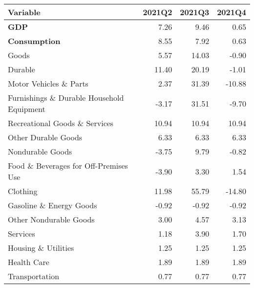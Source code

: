 \documentclass[11pt, letterpaper]{article}\usepackage[]{graphicx}\usepackage[]{color}
\begin{document}
\begin{table}[H]
\centering
\begingroup\fontsize{10pt}{12pt}\selectfont
\begin{tabular}{lrrr}
  \hline
Variable & 2021Q2 & 2021Q3 & 2021Q4 \\ 
  \hline
\hspace{0mm} \textbf{GDP} & 7.26 & 9.46 & 0.65 \\ 
  \hspace{0mm} \textbf{Consumption} & 8.55 & 7.92 & 0.63 \\ 
  \hspace{8mm}  Goods & 5.57 & 14.03 & -0.90 \\ 
  \hspace{16mm}  Durable & 11.40 & 20.19 & -1.01 \\ 
  \hspace{24mm}  Motor Vehicles \& Parts & 2.37 & 31.39 & -10.88 \\ 
  \hspace{24mm}  Furnishings \& Durable Household Equipment & -3.17 & 31.51 & -9.70 \\ 
  \hspace{24mm}  Recreational Goods \& Services & 10.94 & 10.94 & 10.94 \\ 
  \hspace{24mm}  Other Durable Goods & 6.33 & 6.33 & 6.33 \\ 
  \hspace{16mm}  Nondurable Goods & -3.75 & 9.79 & -0.82 \\ 
  \hspace{24mm}  Food \& Beverages for Off-Premises Use & -3.90 & 3.30 & 1.54 \\ 
  \hspace{24mm}  Clothing & 11.98 & 55.79 & -14.80 \\ 
  \hspace{24mm}  Gasoline \& Energy Goods & -0.92 & -0.92 & -0.92 \\ 
  \hspace{24mm}  Other Nondurable Goods & 3.00 & 4.57 & 3.13 \\ 
  \hspace{8mm}  Services & 1.18 & 3.90 & 1.70 \\ 
  \hspace{16mm}  Housing \& Utilities & 1.25 & 1.25 & 1.25 \\ 
  \hspace{16mm}  Health Care & 1.89 & 1.89 & 1.89 \\ 
  \hspace{16mm}  Transportation & 0.77 & 0.77 & 0.77 \\ 

\end{tabular}
\end{table}
\end{document}
